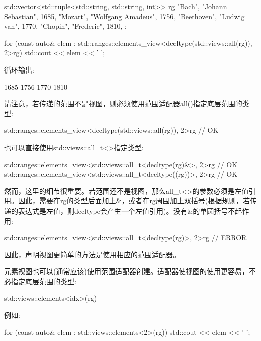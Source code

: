 \begin{cpp}
std::vector<std::tuple<std::string, std::string, int>> rg{
	{"Bach", "Johann Sebastian", 1685}, {"Mozart", "Wolfgang Amadeus", 1756},
	{"Beethoven", "Ludwig van", 1770}, {"Chopin", "Frederic", 1810},
};

for (const auto& elem
	: std::ranges::elements_view<decltype(std::views::all(rg)), 2>{rg}) {
	std::cout << elem << ' ';
}
\end{cpp}

循环输出:

\begin{shell}
1685 1756 1770 1810
\end{shell}

请注意，若传递的范围不是视图，则必须使用范围适配器all()指定底层范围的类型:

\begin{cpp}
std::ranges::elements_view<decltype(std::views::all(rg)), 2>{rg} // OK
\end{cpp}

也可以直接使用std::views::all\_t<>指定类型:

\begin{cpp}
std::ranges::elements_view<std::views::all_t<decltype(rg)&>, 2>{rg} // OK
std::ranges::elements_view<std::views::all_t<decltype((rg))>, 2>{rg} // OK
\end{cpp}

然而，这里的细节很重要。若范围还不是视图，那么all\_t<>的参数必须是左值引用。因此，需要在rg的类型后面加上\&，或者在rg周围加上双括号(根据规则，若传递的表达式是左值，则decltype会产生一个左值引用)。没有\&的单圆括号不起作用:

\begin{cpp}
std::ranges::elements_view<std::views::all_t<decltype(rg)>, 2>{rg} // ERROR
\end{cpp}

因此，声明视图更简单的方法是使用相应的范围适配器。


元素视图也可以(通常应该)使用范围适配器创建。适配器使视图的使用更容易，不必指定底层范围的类型:

\begin{cpp}
std::views::elements<idx>(rg)
\end{cpp}

例如:

\begin{cpp}
for (const auto& elem : std::views::elements<2>(rg)) {
	std::cout << elem << ' ';
}
\end{cpp}

